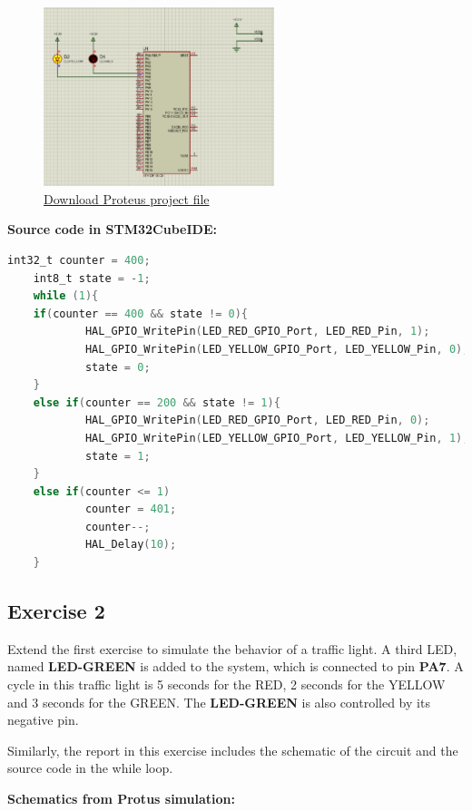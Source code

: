 \documentclass[twoside, final]{hcmut_report}
\begin{document}
\begin{figure}[ht]
    \centering
    \includegraphics[width=0.6\textwidth]{graphics/f2.png}
    \caption{
        \href{https://github.com/batmaon512/Microcontroller-251/blob/main/Lab/Lab1_LED_Animations/Source_Proteus/EX1.pdsprj}{Download Proteus project file}
    }
    \label{fig:proteus_schematic}
\end{figure}

\textbf{Source code in STM32CubeIDE:}
\begin{lstlisting}[language=C, caption=Source code for Exercise 1, label=lst:ex1]
    int32_t counter = 400;
    int8_t state = -1;
    while (1){
    if(counter == 400 && state != 0){
	  		HAL_GPIO_WritePin(LED_RED_GPIO_Port, LED_RED_Pin, 1);
	  		HAL_GPIO_WritePin(LED_YELLOW_GPIO_Port, LED_YELLOW_Pin, 0);
	  		state = 0;
	}
	else if(counter == 200 && state != 1){
	  		HAL_GPIO_WritePin(LED_RED_GPIO_Port, LED_RED_Pin, 0);
	  		HAL_GPIO_WritePin(LED_YELLOW_GPIO_Port, LED_YELLOW_Pin, 1);
	  		state = 1;
	}
	else if(counter <= 1)
	  		counter = 401;
	        counter--;
	        HAL_Delay(10);
    }
\end{lstlisting}
\subsection{Exercise 2}
Extend the first exercise to simulate the behavior of a traffic light. A third LED, named \textbf{LED-GREEN} is added to the system, which is connected to pin \textbf{PA7}. A cycle in this traffic light is 5 seconds for the RED, 2 seconds for the YELLOW and 3 seconds for the GREEN. The \textbf{LED-GREEN} is also controlled by its negative pin.

Similarly, the report in this exercise includes the schematic of the circuit and the source code in the while loop.

\textbf{Schematics from Protus simulation:}
\end{document}
